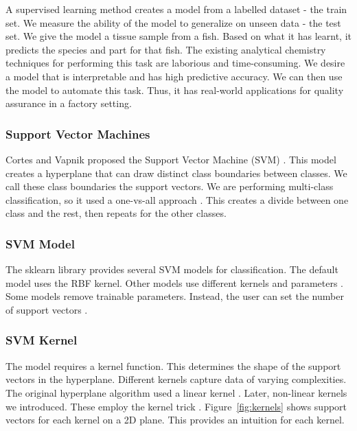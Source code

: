 \documentclass[runningheads]{llncs}
\begin{document}
A supervised learning method creates a model from a labelled dataset - the train set.
We measure the ability of the model to generalize on unseen data - the test set.
We give the model a tissue sample from a fish.
Based on what it has learnt, it predicts the species and part for that fish.
The existing analytical chemistry techniques for performing this task are laborious and time-consuming.
We desire a model that is interpretable and has high predictive accuracy.
We can then use the model to automate this task.
Thus, it has real-world applications for quality assurance in a factory setting.

\subsubsection{Support Vector Machines}
\label{sec:background-svm}

Cortes and Vapnik proposed the Support Vector Machine (SVM) \cite{cortes1995support}.
This model creates a hyperplane that can draw distinct class boundaries between classes.
We call these class boundaries the support vectors.
We are performing multi-class classification, so it used a one-vs-all approach \cite{sklearn2021feature}.
This creates a divide between one class and the rest, then repeats for the other classes.

\subsubsection{SVM Model}
\label{sec:background-svm-model}

The sklearn library provides several SVM models for classification.
The default model uses the RBF kernel.
Other models use different kernels and parameters \cite{sklearn2021feature}.
Some models remove trainable parameters.
Instead, the user can set the number of support vectors \cite{scholkopf2000new}.

\subsubsection{SVM Kernel}
\label{sec:background-svm-kernel}

The model requires a kernel function.
This determines the shape of the support vectors in the hyperplane.
Different kernels capture data of varying complexities.
The original hyperplane algorithm used a linear kernel \cite{aizerman1964theoretical}.
Later, non-linear kernels we introduced.
These employ the kernel trick \cite{boser1992training}.
Figure~\ref{fig:kernels} shows support vectors for each kernel on a 2D plane.
This provides an intuition for each kernel.
\end{document}
